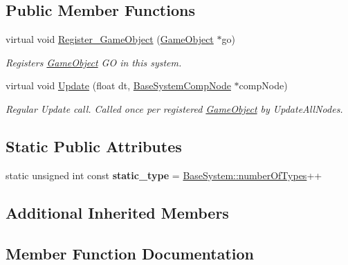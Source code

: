 \subsection*{Public Member Functions}
\begin{DoxyCompactItemize}
\item 
virtual void \hyperlink{classTransformSystem_ab9837e5e3b2aca5c5462f93dbbd71681}{Register\+\_\+\+Game\+Object} (\hyperlink{classGameObject}{Game\+Object} $\ast$go)
\begin{DoxyCompactList}\small\item\em Registers \hyperlink{classGameObject}{Game\+Object} GO in this system. \end{DoxyCompactList}\item 
virtual void \hyperlink{classTransformSystem_a75de8bdeda1137447d575b30d16afb3b}{Update} (float dt, \hyperlink{structBaseSystemCompNode}{Base\+System\+Comp\+Node} $\ast$comp\+Node)
\begin{DoxyCompactList}\small\item\em Regular Update call. Called once per registered \hyperlink{classGameObject}{Game\+Object} by Update\+All\+Nodes. \end{DoxyCompactList}\end{DoxyCompactItemize}
\subsection*{Static Public Attributes}
\begin{DoxyCompactItemize}
\item 
\mbox{\label{classTransformSystem_adad3188481557394985582ef18693b4d}} 
static unsigned int const {\bfseries static\+\_\+type} = \hyperlink{classBaseSystem_a7ef356edab3cfb02905e0a73a645b131}{Base\+System\+::number\+Of\+Types}++
\end{DoxyCompactItemize}
\subsection*{Additional Inherited Members}


\subsection{Member Function Documentation}
\mbox{\label{classTransformSystem_ab9837e5e3b2aca5c5462f93dbbd71681}} 
